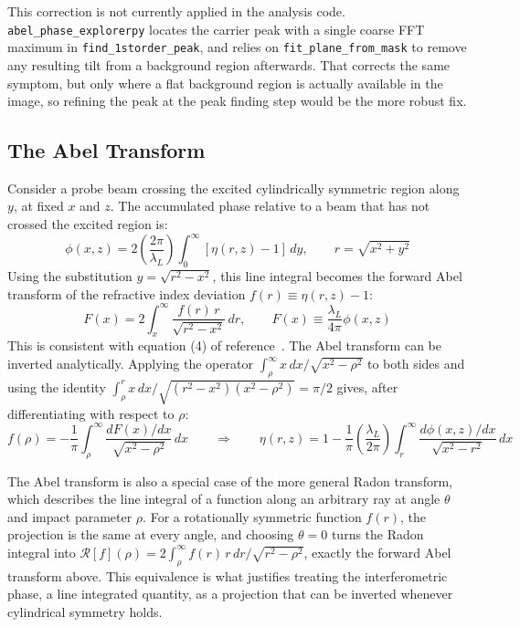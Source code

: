 This correction is not currently applied in the analysis code. \texttt{abel\_phase\_explorer\dotb py} locates the carrier peak with a single coarse FFT maximum in \texttt{find\_1storder\_peak}, and relies on \texttt{fit\_plane\_from\_mask} to remove any resulting tilt from a background region afterwards. That corrects the same symptom, but only where a flat background region is actually available in the image, so refining the peak at the peak finding step would be the more robust fix.

\subsection{The Abel Transform}

Consider a probe beam crossing the excited cylindrically symmetric region along $y$, at fixed $x$ and $z$. The accumulated phase relative to a beam that has not crossed the excited region is:
\begin{equation}
\phi(x,z) = 2\left(\frac{2\pi}{\lambda_L}\right)\int_0^{\infty}[\eta(r,z) - 1] \, dy, \qquad r = \sqrt{x^2+y^2}
\end{equation}
Using the substitution $y = \sqrt{r^2 - x^2}$, this line integral becomes the forward Abel transform of the refractive index deviation $f(r) \equiv \eta(r,z)-1$:
\begin{equation}
\boxed{F(x) = 2\int_x^{\infty} \frac{f(r) \, r}{\sqrt{r^2 - x^2}} \, dr}, \qquad F(x) \equiv \frac{\lambda_L}{4\pi}\phi(x,z)
\end{equation}
This is consistent with equation (4) of reference~\cite{gonzalez2012plasma}. The Abel transform can be inverted analytically. Applying the operator $\int_\rho^\infty x\,dx/\sqrt{x^2-\rho^2}$ to both sides and using the identity $\int_\rho^r x\,dx/\sqrt{(r^2-x^2)(x^2-\rho^2)} = \pi/2$ gives, after differentiating with respect to $\rho$:
\begin{equation}
\boxed{f(\rho) = -\frac{1}{\pi} \int_{\rho}^{\infty} \frac{dF(x)/dx}{\sqrt{x^2 - \rho^2}} \, dx}
\qquad\Longrightarrow\qquad
\boxed{\eta(r,z) = 1 - \frac{1}{\pi}\left(\frac{\lambda_L}{2\pi}\right)\int_r^{\infty} \frac{d\phi(x,z)/dx}{\sqrt{x^2 - r^2}} \, dx}
\end{equation}

The Abel transform is also a special case of the more general Radon transform, which describes the line integral of a function along an arbitrary ray at angle $\theta$ and impact parameter $\rho$. For a rotationally symmetric function $f(r)$, the projection is the same at every angle, and choosing $\theta=0$ turns the Radon integral into $\mathcal{R}[f](\rho) = 2\int_\rho^\infty f(r)\,r\,dr/\sqrt{r^2-\rho^2}$, exactly the forward Abel transform above. This equivalence is what justifies treating the interferometric phase, a line integrated quantity, as a projection that can be inverted whenever cylindrical symmetry holds.

